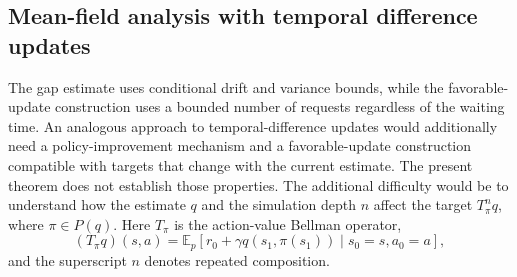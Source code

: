 




















































































\subsection{Mean-field analysis with temporal difference updates}
\label{sec: discussion temporal difference}

The gap estimate uses conditional drift and variance bounds, while the favorable-update construction uses a bounded number of requests regardless of the waiting time. An analogous approach to temporal-difference updates would additionally need a policy-improvement mechanism and a favorable-update construction compatible with targets that change with the current estimate. The present theorem does not establish those properties.
The additional difficulty would be to understand how the estimate $q$ and the simulation depth $n$ affect the target $T_{\pi}^n q$, where $\pi \in P(q)$. Here $T_\pi$ is the action-value Bellman operator,
\[
(T_\pi q)(s,a)=\mathbb E_p\!\left[r_0+\gamma q(s_1,\pi(s_1))\mid s_0=s,a_0=a\right],
\]
and the superscript $n$ denotes repeated composition.




